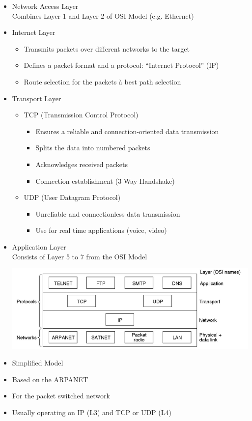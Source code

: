 \documentclass[11pt]{article}
\begin{document}
\begin{itemize}
    \item Network Access Layer \\
    Combines Layer 1 and Layer 2 of OSI Model (e.g. Ethernet)
    \item Internet Layer
    \begin{itemize}
        \item Transmits packets over different networks to the target
        \item Defines a packet format and a protocol: “Internet Protocol” (IP)
        \item Route selection for the packets à best path selection
    \end{itemize}
    \item Transport Layer
    \begin{itemize}
        \item TCP (Transmission Control Protocol)
        \begin{itemize}
            \item Ensures a reliable and connection-oriented data transmission
            \item Splits the data into numbered packets
            \item Acknowledges received packets
            \item Connection establishment (3 Way Handshake)
        \end{itemize}
        \item UDP (User Datagram Protocol)
        \begin{itemize}
            \item Unreliable and connectionless data transmission
            \item Use for real time applications (voice, video)
        \end{itemize}
    \end{itemize}
    \item Application Layer \\
    Consists of Layer 5 to 7 from the OSI Model
    
    \includegraphics[width=\textwidth]{tcp-ip-application-layer}
\end{itemize}
\begin{itemize}
    \item Simplified Model
    \item Based on the ARPANET
    \item For the packet switched network
    \item Usually operating on IP (L3) and TCP or UDP (L4)
\end{itemize}
\end{document}
